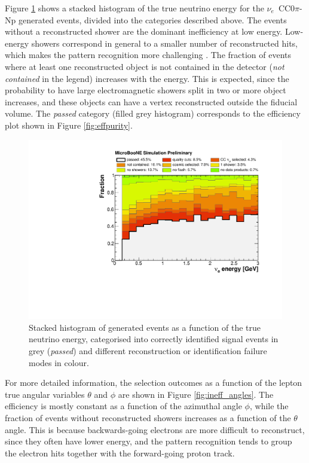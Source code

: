 Figure \ref{fig:ineff} shows a stacked histogram of the true neutrino energy for the $\nu_e$~CC0$\pi$-Np generated events, divided into the categories described above. The events without a reconstructed shower are the dominant inefficiency at low energy. Low-energy showers correspond in general to a smaller number of reconstructed hits, which makes the pattern recognition more challenging \cite{Acciarri:2017hat}. The fraction of events where at least one reconstructed object is not contained in the detector (\emph{not contained} in the legend) increases with the energy. This is expected, since the probability to have large electromagnetic showers split in two or more object increases, and these objects can have a vertex reconstructed outside the fiducial volume. The \emph{passed} category (filled grey histogram) corresponds to the efficiency plot shown in Figure \ref{fig:effpurity}.

\begin{figure}
\centering
  \includegraphics[width=0.8\linewidth]{figures/ineff_ene.pdf}
  \caption{Stacked histogram of generated events as a function of the true neutrino energy, categorised into correctly identified signal events in grey {(\emph{passed})} and different reconstruction or identification failure modes in colour.}
  \label{fig:ineff}
\end{figure}

For more detailed information, the selection outcomes as a function of the lepton true angular variables $\theta$ and $\phi$ are shown in Figure \ref{fig:ineff_angles}. The efficiency is mostly constant as a function of the azimuthal angle $\phi$, while the fraction of events without reconstructed showers increases as a function of the $\theta$ angle. This is because backwards-going electrons are more difficult to reconstruct, since they often have lower energy, and the pattern recognition tends to group the electron hits together with the forward-going proton track.

